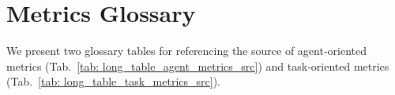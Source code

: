 \section{Metrics Glossary}
\label{sec: metrics glossary}

We present two glossary tables for referencing the source of agent-oriented metrics (Tab.~\ref{tab: long_table_agent_metrics_src}) and task-oriented metrics (Tab.~\ref{tab: long_table_task_metrics_src}).





